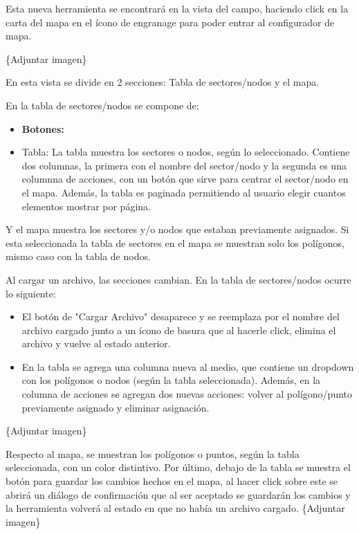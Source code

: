 Esta nueva herramienta se encontrará en la vista del campo, haciendo click en la carta del mapa en el ícono de engranage para poder entrar al configurador de mapa.

\{Adjuntar imagen\}

En esta vista se divide en 2 secciones: Tabla de sectores/nodos y el mapa.

En la tabla de sectores/nodos se compone de:

\begin{itemize}
    \item \textbf{Botones:}
    \item Tabla: La tabla muestra los sectores o nodos, según lo seleccionado. Contiene dos columnas, la primera con el nombre del sector/nodo y la segunda es una columnna de acciones, con un botón que sirve para centrar el sector/nodo en el mapa. Además, la tabla es paginada permitiendo al usuario elegir cuantos elementos mostrar por página.
\end{itemize}

Y el mapa muestra los sectores y/o nodos que estaban previamente asignados. Si esta seleccionada la tabla de sectores en el mapa se muestran solo los polígonos, mismo caso con la tabla de nodos.

Al cargar un archivo, las secciones cambian. En la tabla de sectores/nodos ocurre lo siguiente:

\begin{itemize}
    \item El botón de "Cargar Archivo" desaparece y se reemplaza por el nombre del archivo cargado junto a un ícono de basura que al hacerle click, elimina el archivo y vuelve al estado anterior.
    \item En la tabla se agrega una columna nueva al medio, que contiene un dropdown con los polígonos o nodos (según la tabla seleccionada). Además, en la columna de acciones se agregan dos nuevas acciones: volver al polígono/punto previamente asignado y eliminar asignación. 
\end{itemize}



\{Adjuntar imagen\}

Respecto al mapa, se muestran los polígonos o puntos, según la tabla seleccionada, con un color distintivo. Por último, debajo de la tabla se muestra el botón para guardar los cambios hechos en el mapa, al hacer click sobre este se abrirá un diálogo de confirmación que al ser aceptado se guardarán los cambios y la herramienta volverá al estado en que no había un archivo cargado.
\{Adjuntar imagen\}

